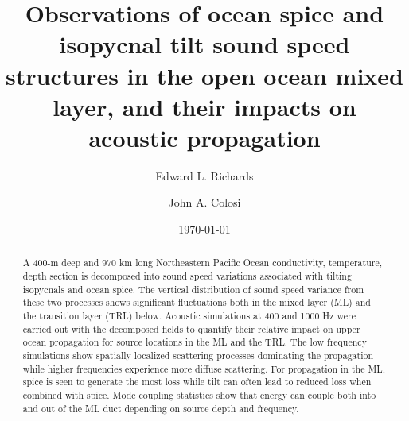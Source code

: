 \documentclass[preprint,NumberedRefs]{JASA}
\begin{document}
\title[Mixed layer tilt and spice]{Observations of ocean spice and isopycnal tilt sound speed structures in the open ocean mixed layer, and their impacts on acoustic propagation}
\author{Edward L. Richards}
\author{John A. Colosi}

\date{\today}

\begin{abstract}
A 400-m deep and 970 km long Northeastern Pacific Ocean conductivity, temperature, depth section is decomposed into sound speed variations associated with tilting isopycnals and ocean spice. The vertical distribution of sound speed variance from these two processes shows significant fluctuations both in the mixed layer (ML) and the transition layer (TRL) below. Acoustic simulations at 400 and 1000 Hz were carried out with the decomposed fields to quantify their relative impact on upper ocean propagation for source locations in the ML and the TRL. The low frequency simulations show spatially localized scattering processes dominating the propagation while higher frequencies experience more diffuse scattering. For propagation in the ML, spice is seen to generate the most loss while tilt can often lead to reduced loss when combined with spice. Mode coupling statistics show that energy can couple both into and out of the ML duct depending on source depth and frequency.
\end{abstract}

\maketitle
\end{document}
